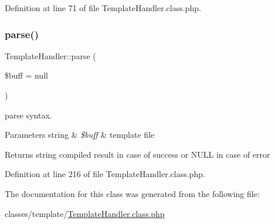 Definition at line 71 of file Template\+Handler.\+class.\+php.

\mbox{\label{classTemplateHandler_acf0023ac6383d43e9b0ab854c75c0694}} 
\subsubsection{\texorpdfstring{parse()}{parse()}}
{\footnotesize\ttfamily Template\+Handler\+::parse (\begin{DoxyParamCaption}\item[{}]{\$buff = {\ttfamily null} }\end{DoxyParamCaption})\hspace{0.3cm}{\ttfamily [protected]}}

parse syntax. 
\begin{DoxyParams}[1]{Parameters}
string & {\em \$buff} & template file \\
\hline
\end{DoxyParams}
\begin{DoxyReturn}{Returns}
string compiled result in case of success or N\+U\+LL in case of error 
\end{DoxyReturn}


Definition at line 216 of file Template\+Handler.\+class.\+php.



The documentation for this class was generated from the following file\+:\begin{DoxyCompactItemize}
\item 
classes/template/\hyperlink{TemplateHandler_8class_8php}{Template\+Handler.\+class.\+php}\end{DoxyCompactItemize}
